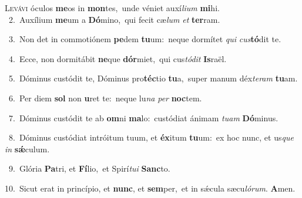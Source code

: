 \lettrine{\initial\textcolor{\initialcolor}{L}}{evávi} óculos \textbf{me}\-os in \textbf{mon}\-tes,~\star unde véniet auxí\-\textit{li}\-\textit{um} \textbf{mi}\-hi.\\
{\numbfont\textcolor{\numbcolor}{~2.}}~Auxílium \textbf{me}\-um a \textbf{Dó}\-mino,~\star qui fecit cæ\textit{lum} \textit{et} \textbf{ter}\-ram.\par
{\numbfont\textcolor{\numbcolor}{~3.}}~Non det in commotiónem \textbf{pe}\-dem \textbf{tu}\-um:~\star neque dormítet \textit{qui} \textit{cus}\-\textbf{tó}dit te.\par
{\numbfont\textcolor{\numbcolor}{~4.}}~Ecce, non dormitábit \textbf{ne}\-que \textbf{dór}\-miet,~\star qui cus\-\textit{tó}\-\textit{dit} \textbf{Is}\-raël.\par
{\numbfont\textcolor{\numbcolor}{~5.}}~Dóminus custódit te, Dóminus pro\-\textbf{téc}\-tio \textbf{tu}\-a,~\star super manum déx\-\textit{te}\-\textit{ram} \textbf{tu}\-am.\par
{\numbfont\textcolor{\numbcolor}{~6.}}~Per diem \textbf{sol} non \textbf{u}\-ret te:~\star neque lu\textit{na} \textit{per} \textbf{noc}\-tem.\par
{\numbfont\textcolor{\numbcolor}{~7.}}~Dóminus custódit te ab \textbf{om}\-ni \textbf{ma}\-lo:~\star custódiat ánimam \textit{tu}\-\textit{am} \textbf{Dó}\-minus.\par
{\numbfont\textcolor{\numbcolor}{~8.}}~Dóminus custódiat intróitum tuum, et \textbf{éx}\-itum \textbf{tu}\-um:~\star ex hoc nunc, et us\textit{que} \textit{in} \textbf{sǽ}\-culum.\par
{\numbfont\textcolor{\numbcolor}{~9.}}~Glória \textbf{Pa}\-tri, et \textbf{Fí}\-lio,~\star et Spirí\-\textit{tu}\-\textit{i} \textbf{Sanc}\-to.\par
{\numbfont\textcolor{\numbcolor}{10.}}~Sicut erat in princípio, et \textbf{nunc}\-, et \textbf{sem}\-per,~\star et in sǽcula sæcu\-\textit{ló}\-\textit{rum}. \textbf{A}\-men.\par
